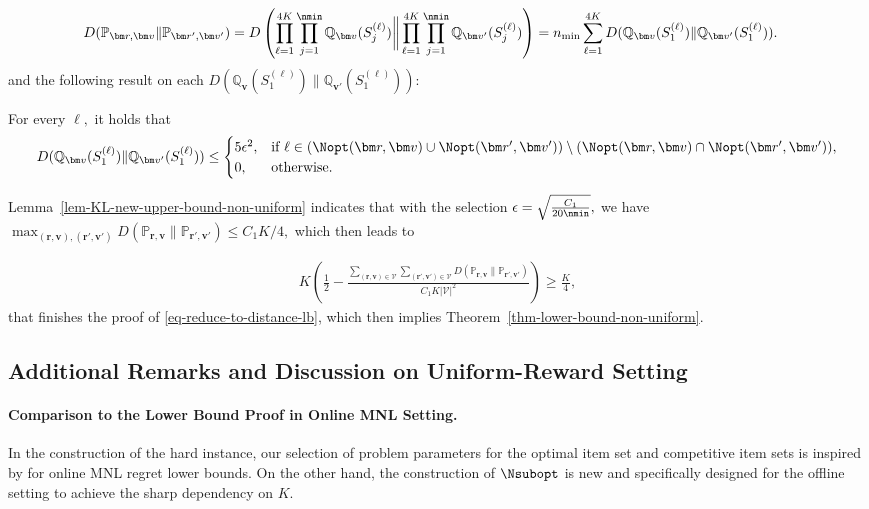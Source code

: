 \documentclass[10pt, letterpaper]{article}
\begin{document}
\begin{align*}
    D(\mathbb{P}_{\bm r, \bm v} \lVert \mathbb{P}_{\bm r', \bm v'}) &= D\left( \prod_{\ell=1}^{4K}\prod_{j = 1}^{\nmin} \mathbb{Q}_{\bm v}(S_{j}^{(\ell)}) \bigg\lVert \prod_{\ell=1}^{4K}\prod_{j = 1}^{\nmin} \mathbb{Q}_{\bm v'}(S_{j}^{(\ell)})  \right)= n_{\min}\sum_{\ell = 1}^{4K} D(\mathbb{Q}_{\bm v} (S^{(\ell)}_1) \rVert \mathbb{Q}_{\bm v'} (S^{(\ell)}_1)).
\end{align*}
and the following result on each $D(\mathbb{Q}_{\bm v} (S^{(\ell)}_1) \rVert \mathbb{Q}_{\bm v'} (S^{(\ell)}_1))$:
\begin{lemma}\label{lem-KL-new-upper-bound-non-uniform}
    For every $\ell,$ it holds that \begin{align*}
        D(\mathbb{Q}_{\bm v} (S^{(\ell)}_1) \rVert \mathbb{Q}_{\bm v'} (S^{(\ell)}_1)) \leq 
\begin{cases}
    5\epsilon^2,  & \text{if }  \ell \in (\Nopt(\bm r, \bm v) \cup \Nopt(\bm r', \bm v'))\setminus(\Nopt(\bm r, \bm v)\cap \Nopt(\bm r', \bm v')), \\
    0,& \text{otherwise.}
\end{cases} 
    \end{align*}
\end{lemma}

Lemma~\ref{lem-KL-new-upper-bound-non-uniform} indicates that with the selection $\epsilon =\sqrt{\frac{C_1} {20\nmin}},$ we have $\max_{(\bm r, \bm v),(\bm r', \bm v')} D(\mathbb{P}_{\bm r, \bm v} \lVert \mathbb{P}_{\bm r', \bm v'})\leq C_1K/4,$ which then leads to

\begin{align*}
  K\left(\frac{1}{2} - \frac{\sum_{(\bm r, \bm v)\in \mathcal{V}}\sum_{(\bm r', \bm v')\in \mathcal{V}} D(\mathbb{P}_{\bm r, \bm v} \lVert \mathbb{P}_{\bm r', \bm v'}) }{C_1 K\lvert \mathcal V \rvert^2} \right)\geq \frac{K}{4},
\end{align*}
that finishes the proof of \eqref{eq-reduce-to-distance-lb}, which then implies Theorem~\ref{thm-lower-bound-non-uniform}. 




\subsection{Additional Remarks and Discussion on Uniform-Reward Setting}
\paragraph{Comparison to the Lower Bound Proof in Online MNL Setting.} In the construction of the hard instance, our selection of problem parameters for the optimal item set and competitive item sets is inspired by \citet{chen2018note} for online MNL regret lower bounds. On the other hand, the construction of $\Nsubopt$ is new and specifically designed for the offline setting to achieve the sharp dependency on $K$. 
\end{document}
